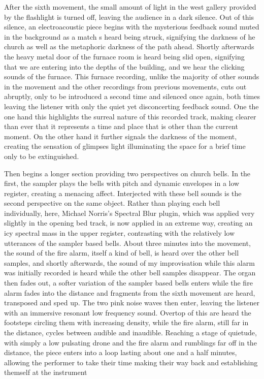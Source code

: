 \documentclass[12pt,twoside,maitrise]{dms_ks}
\theoremstyle{definition}
\begin{document}
{After the sixth movement, the small amount of light in the west gallery provided by the flashlight is turned off, leaving the audience in a dark silence. 
Out of this silence, an electroacoustic piece begins with the mysterious feedback sound muted in the background as a match s heard being struck, signifying the darkness of he church as well as the metaphoric darkness of the path ahead. 
Shortly afterwards the heavy metal door of the furnace room is heard being slid open, signifying that we are entering into the depths of the building, and we hear the clicking sounds of the furnace. 
This furnace recording, unlike the majority of other sounds in the movement and the other recordings from previous movements, cuts out abruptly, only to be introduced a second time and silenced once again, both times leaving the listener with only the quiet yet disconcerting feedback sound. 
One the one hand this highlights the surreal nature of this recorded track, making clearer than ever that it represents a time and place that is other than the current moment. 
On the other hand it further signals the darkness of the moment, creating the sensation of glimpses light illuminating the space for a brief time only to be extinguished. 

Then begins a longer section providing two perspectives on church bells. 
In the first, the sampler plays the bells with pitch and dynamic envelopes in a low register, creating a menacing affect. 
Interjected with these bell sounds is the second perspective on the same object. 
Rather than playing each bell individually, here, Michael Norris's Spectral Blur plugin, which was applied very slightly in the opening bed track, is now applied in an extreme way, creating an icy spectral mass in the upper register, contrasting with the relatively low utterances of the sampler based bells. 
About three minutes into the movement, the sound of the fire alarm, itself a kind of bell, is heard over the other bell samples, and shortly afterwards, the sound of my improvisation while this alarm was initially recorded is heard while the other bell samples disappear. 
The organ then fades out, a softer variation of the sampler based bells enters while the fire alarm fades into the distance and fragments from the sixth movement are heard, transposed and sped up. 
The two pink noise waves then enter, leaving the listener with an immersive resonant low frequency sound. 
Overtop of this are heard the footsteps circling them with increasing density, while the fire alarm, still far in the distance, cycles between audible and inaudible. 
Reaching a stage of quietude, with simply a low pulsating drone and the fire alarm and rumblings far off in the distance, the piece enters into a loop lasting about one and a half minutes, allowing the performer to take their time making their way back and establishing themself at the instrument

}
\end{document}
